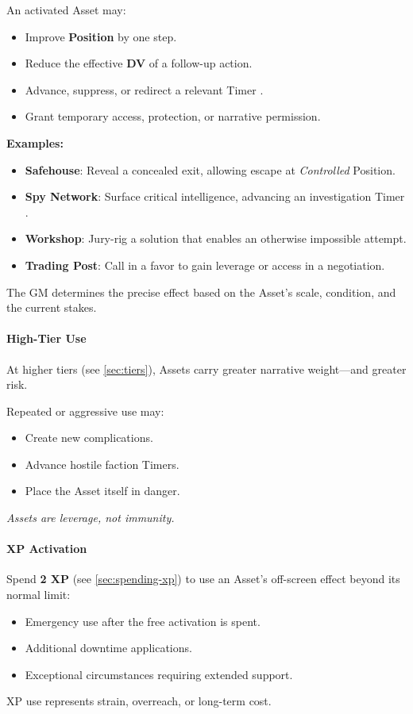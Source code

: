 An activated Asset may:
\begin{itemize}
  \item Improve \textbf{Position} by one step.
  \item Reduce the effective \textbf{DV} of a follow-up action.
  \item Advance, suppress, or redirect a relevant Timer .
  \item Grant temporary access, protection, or narrative permission.
\end{itemize}

\textbf{Examples:}
\begin{itemize}
  \item \textbf{Safehouse}: Reveal a concealed exit, allowing escape at \emph{Controlled} Position.
  \item \textbf{Spy Network}: Surface critical intelligence, advancing an investigation Timer .
  \item \textbf{Workshop}: Jury-rig a solution that enables an otherwise impossible attempt.
  \item \textbf{Trading Post}: Call in a favor to gain leverage or access in a negotiation.
\end{itemize}

The GM determines the precise effect based on the Asset's scale, condition, and the current stakes.

\paragraph{High-Tier Use}
\label{sec:asset-high-tier}
At higher tiers (see \ref{sec:tiers}), Assets carry greater narrative weight---and greater risk.

Repeated or aggressive use may:
\begin{itemize}
  \item Create new complications.
  \item Advance hostile faction Timers.
  \item Place the Asset itself in danger.
\end{itemize}
\emph{Assets are leverage, not immunity.}

\paragraph{XP Activation}
\label{sec:asset-xp-activation}
Spend \textbf{2 XP} (see \ref{sec:spending-xp}) to use an Asset's off-screen effect beyond its normal limit:
\begin{itemize}
\item Emergency use after the free activation is spent.
\item Additional downtime applications.
\item Exceptional circumstances requiring extended support.
\end{itemize}
XP use represents strain, overreach, or long-term cost.

